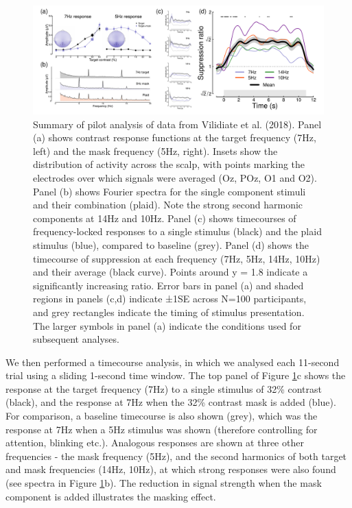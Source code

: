 \documentclass[
]{article}
\begin{document}
\begin{figure}

{\centering \includegraphics{Figures/VilidaiteData} 

}

\caption{Summary of pilot analysis of data from Vilidiate et al. (2018). Panel (a) shows contrast response functions at the target frequency (7Hz, left) and the mask frequency (5Hz, right). Insets show the distribution of activity across the scalp, with points marking the electrodes over which signals were averaged (Oz, POz, O1 and O2). Panel (b) shows Fourier spectra for the single component stimuli and their combination (plaid). Note the strong second harmonic components at 14Hz and 10Hz. Panel (c) shows timecourses of frequency-locked responses to a single stimulus (black) and the plaid stimulus (blue), compared to baseline (grey). Panel (d) shows the timecourse of suppression at each frequency (7Hz, 5Hz, 14Hz, 10Hz) and their average (black curve). Points around y = 1.8 indicate a significantly increasing ratio. Error bars in panel (a) and shaded regions in panels (c,d) indicate ±1SE across N=100 participants, and grey rectangles indicate the timing of stimulus presentation. The larger symbols in panel (a) indicate the conditions used for subsequent analyses.}\label{fig:Pilotdata}
\end{figure}

We then performed a timecourse analysis, in which we analysed each 11-second trial using a sliding 1-second time window. The top panel of Figure \ref{fig:Pilotdata}c shows the response at the target frequency (7Hz) to a single stimulus of 32\% contrast (black), and the response at 7Hz when the 32\% contrast mask is added (blue). For comparison, a baseline timecourse is also shown (grey), which was the response at 7Hz when a 5Hz stimulus was shown (therefore controlling for attention, blinking etc.). Analogous responses are shown at three other frequencies - the mask frequency (5Hz), and the second harmonics of both target and mask frequencies (14Hz, 10Hz), at which strong responses were also found (see spectra in Figure \ref{fig:Pilotdata}b). The reduction in signal strength when the mask component is added illustrates the masking effect.
\end{document}
